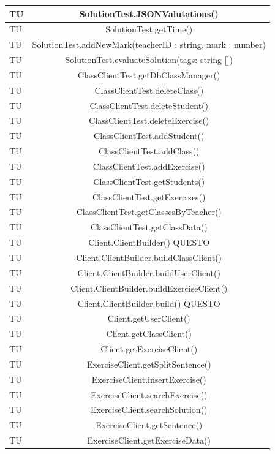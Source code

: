 \begin{longtable}{|>{\centering\arraybackslash}m{1.6cm}|c|}
		TU & SolutionTest.JSONValutations()\\ \hline
		TU & SolutionTest.getTime()\\ \hline
		TU & SolutionTest.addNewMark(teacherID : string, mark : number)\\ \hline
		TU & SolutionTest.evaluateSolution(tags: string [])\\ \hline
		TU & ClassClientTest.getDbClassManager()  \\ \hline
		TU & ClassClientTest.deleteClass()  \\ \hline
		TU & ClassClientTest.deleteStudent()  \\ \hline
		TU & ClassClientTest.deleteExercise()  \\ \hline
		TU & ClassClientTest.addStudent()  \\ \hline
		TU & ClassClientTest.addClass()  \\ \hline
		TU & ClassClientTest.addExercise()  \\ \hline
		TU & ClassClientTest.getStudents()  \\ \hline
		TU & ClassClientTest.getExercises()  \\ \hline
		TU & ClassClientTest.getClassesByTeacher()  \\ \hline
		TU & ClassClientTest.getClassData()  \\ \hline
		TU & Client.ClientBuilder() QUESTO  \\ \hline
		TU & Client.ClientBuilder.buildClassClient()  \\ \hline
		TU & Client.ClientBuilder.buildUserClient()  \\ \hline
		TU & Client.ClientBuilder.buildExerciseClient()  \\ \hline
		TU & Client.ClientBuilder.build() QUESTO \\ \hline	
		TU & Client.getUserClient()  \\ \hline
		TU & Client.getClassClient()  \\ \hline
		TU & Client.getExerciseClient()  \\ \hline
		TU & ExerciseClient.getSplitSentence()  \\ \hline
		TU & ExerciseClient.insertExercise()  \\ \hline
		TU & ExerciseClient.searchExercise()  \\ \hline
		TU & ExerciseClient.searchSolution()  \\ \hline
		TU & ExerciseClient.getSentence()  \\ \hline
		TU & ExerciseClient.getExerciseData()  \\ \hline

\end{longtable}

